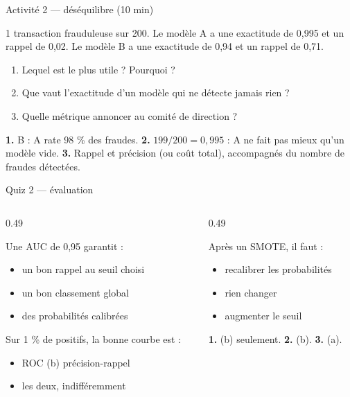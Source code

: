 \begin{frame}{Activité 2 --- déséquilibre (10 min)}
\begin{abox}
1 transaction frauduleuse sur 200. Le modèle A a une exactitude de 0,995 et un
rappel de 0,02. Le modèle B a une exactitude de 0,94 et un rappel de 0,71.
\begin{enumerate}
  \item Lequel est le plus utile ? Pourquoi ?
  \item Que vaut l'exactitude d'un modèle qui ne détecte jamais rien ?
  \item Quelle métrique annoncer au comité de direction ?
\end{enumerate}
\end{abox}
\vspace{1mm}
\begin{solbox}[Réponses]
\textbf{1.} B : A rate 98 \% des fraudes. \textbf{2.} $199/200=0{,}995$ :
A ne fait pas mieux qu'un modèle vide. \textbf{3.} Rappel et précision (ou
coût total), accompagnés du nombre de fraudes détectées.
\end{solbox}
\end{frame}

\begin{frame}{Quiz 2 --- évaluation}
\begin{columns}[t]
\begin{column}{0.49\textwidth}
\begin{qbox}[Question 1]
Une AUC de 0,95 garantit :
\begin{itemize}
  \item[(a)] un bon rappel au seuil choisi
  \item[(b)] un bon classement global
  \item[(c)] des probabilités calibrées
\end{itemize}
\end{qbox}
\begin{qbox}[Question 2]
Sur 1 \% de positifs, la bonne courbe est :
\begin{itemize}
  \item[(a)] ROC \quad (b) précision-rappel
  \item[(c)] les deux, indifféremment
\end{itemize}
\end{qbox}
\end{column}
\begin{column}{0.49\textwidth}
\begin{qbox}[Question 3]
Après un SMOTE, il faut :
\begin{itemize}
  \item[(a)] recalibrer les probabilités
  \item[(b)] rien changer
  \item[(c)] augmenter le seuil
\end{itemize}
\end{qbox}
\begin{solbox}[Réponses]
\textbf{1.} (b) seulement. \quad \textbf{2.} (b). \quad \textbf{3.} (a).
\end{solbox}
\end{column}
\end{columns}
\end{frame}
